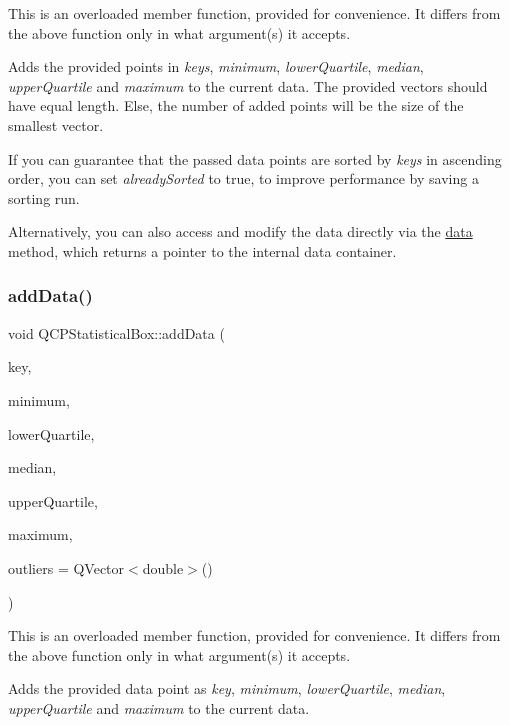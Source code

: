 This is an overloaded member function, provided for convenience. It differs from the above function only in what argument(s) it accepts.

Adds the provided points in {\itshape keys}, {\itshape minimum}, {\itshape lower\+Quartile}, {\itshape median}, {\itshape upper\+Quartile} and {\itshape maximum} to the current data. The provided vectors should have equal length. Else, the number of added points will be the size of the smallest vector.

If you can guarantee that the passed data points are sorted by {\itshape keys} in ascending order, you can set {\itshape already\+Sorted} to true, to improve performance by saving a sorting run.

Alternatively, you can also access and modify the data directly via the \hyperlink{class_q_c_p_statistical_box_a728e501413eaf191544014173d52dfbc}{data} method, which returns a pointer to the internal data container. \mbox{\label{class_q_c_p_statistical_box_a026f2790b530d6f29312254ecb1e7c1e}} 
\subsubsection{\texorpdfstring{add\+Data()}{addData()}\hspace{0.1cm}{\footnotesize\ttfamily [2/2]}}
{\footnotesize\ttfamily void Q\+C\+P\+Statistical\+Box\+::add\+Data (\begin{DoxyParamCaption}\item[{double}]{key,  }\item[{double}]{minimum,  }\item[{double}]{lower\+Quartile,  }\item[{double}]{median,  }\item[{double}]{upper\+Quartile,  }\item[{double}]{maximum,  }\item[{const Q\+Vector$<$ double $>$ \&}]{outliers = {\ttfamily QVector$<$double$>$()} }\end{DoxyParamCaption})}

This is an overloaded member function, provided for convenience. It differs from the above function only in what argument(s) it accepts.

Adds the provided data point as {\itshape key}, {\itshape minimum}, {\itshape lower\+Quartile}, {\itshape median}, {\itshape upper\+Quartile} and {\itshape maximum} to the current data.

